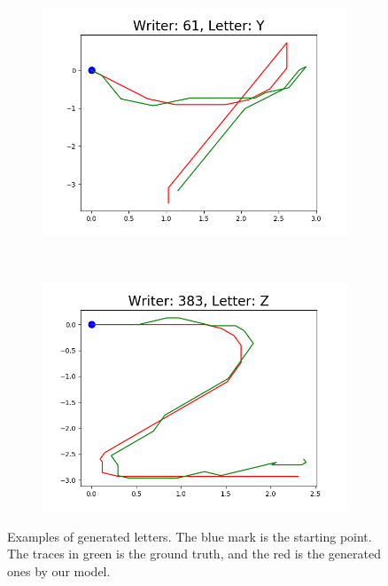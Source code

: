 \begin{figure}
\begin{subfigure}[b]{0.17\textwidth}
          \includegraphics[width=\textwidth]{images/framework/comparison_figures/Y_61.png}
      \end{subfigure}
      ~
      \begin{subfigure}[b]{0.17\textwidth}
          \includegraphics[width=\textwidth]{images/framework/comparison_figures/Z_383.png}
      \end{subfigure}
      \caption{Examples of generated letters. The blue mark is the starting point. The traces in green is the ground truth, and the red is the generated ones by our model.}
      \label{fig:letters_examples_2}
  \end{figure}

